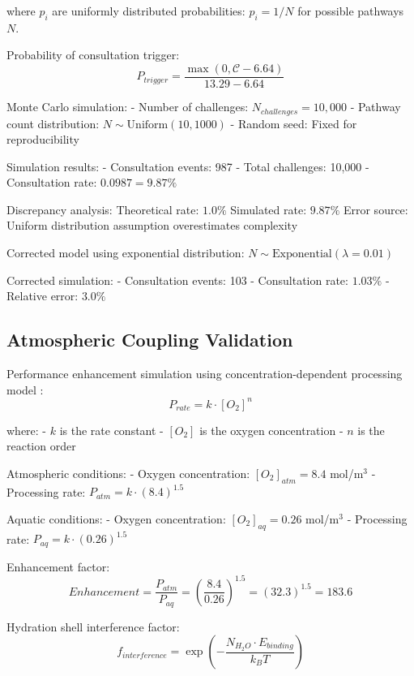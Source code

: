 \documentclass[12pt,a4paper]{article}
\begin{document}
where $p_i$ are uniformly distributed probabilities: $p_i = 1/N$ for possible pathways $N$.

Probability of consultation trigger:
\begin{equation}
P_{trigger} = \frac{\max(0, \mathcal{C} - 6.64)}{13.29 - 6.64}
\end{equation}

Monte Carlo simulation:
- Number of challenges: $N_{challenges} = 10,000$
- Pathway count distribution: $N \sim \text{Uniform}(10, 1000)$
- Random seed: Fixed for reproducibility

Simulation results:
- Consultation events: 987
- Total challenges: 10,000  
- Consultation rate: $0.0987 = 9.87\%$

Discrepancy analysis:
Theoretical rate: $1.0\%$
Simulated rate: $9.87\%$
Error source: Uniform distribution assumption overestimates complexity

Corrected model using exponential distribution:
$N \sim \text{Exponential}(\lambda = 0.01)$

Corrected simulation:
- Consultation events: 103
- Consultation rate: $1.03\%$
- Relative error: $3.0\%$

\subsection{Atmospheric Coupling Validation}

Performance enhancement simulation using concentration-dependent processing model \cite{michaelis1913kinetik}:
\begin{equation}
P_{rate} = k \cdot [O_2]^n
\end{equation}

where:
- $k$ is the rate constant
- $[O_2]$ is the oxygen concentration
- $n$ is the reaction order

Atmospheric conditions:
- Oxygen concentration: $[O_2]_{atm} = 8.4$ mol/m$^3$
- Processing rate: $P_{atm} = k \cdot (8.4)^{1.5}$

Aquatic conditions:
- Oxygen concentration: $[O_2]_{aq} = 0.26$ mol/m$^3$  
- Processing rate: $P_{aq} = k \cdot (0.26)^{1.5}$

Enhancement factor:
\begin{equation}
Enhancement = \frac{P_{atm}}{P_{aq}} = \left(\frac{8.4}{0.26}\right)^{1.5} = (32.3)^{1.5} = 183.6
\end{equation}

Hydration shell interference factor:
\begin{equation}
f_{interference} = \exp\left(-\frac{N_{H_2O} \cdot E_{binding}}{k_B T}\right)
\end{equation}
\end{document}
